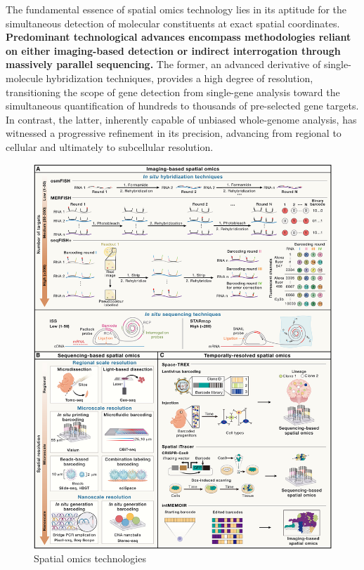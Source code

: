 \documentclass[
]{book}
\begin{document}
The fundamental essence of spatial omics technology lies in its aptitude for the simultaneous detection of molecular constituents at exact spatial coordinates. \textbf{Predominant technological advances encompass methodologies reliant on either imaging-based detection or indirect interrogation through massively parallel sequencing. } The former, an advanced derivative of single-molecule hybridization techniques, provides a high degree of resolution, transitioning the scope of gene detection from single-gene analysis toward the simultaneous quantification of hundreds to thousands of pre-selected gene targets. In contrast, the latter, inherently capable of unbiased whole-genome analysis, has witnessed a progressive refinement in its precision, advancing from regional to cellular and ultimately to subcellular resolution.

\begin{figure}
\centering
\includegraphics{./figs/spatialtech/Spatial omics technologies.jpg}
\caption{Spatial omics technologies}
\end{figure}
\end{document}
